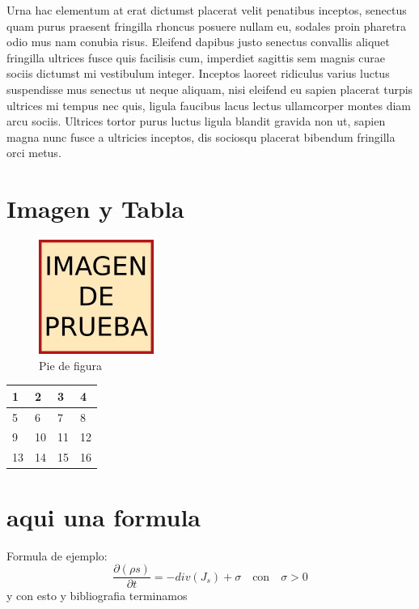 \documentclass[a4paper,12pt]{article}
\begin{document}
Urna hac elementum at erat dictumst placerat velit penatibus inceptos, senectus quam purus praesent fringilla rhoncus posuere nullam eu, sodales proin pharetra odio mus nam conubia risus. Eleifend dapibus justo senectus convallis aliquet fringilla ultrices fusce quis facilisis cum, imperdiet sagittis sem magnis curae sociis dictumst mi vestibulum integer. Inceptos laoreet ridiculus varius luctus suspendisse mus senectus ut neque aliquam, nisi eleifend eu sapien placerat turpis ultrices mi tempus nec quis, ligula faucibus lacus lectus ullamcorper montes diam arcu sociis. Ultrices tortor purus luctus ligula blandit gravida non ut, sapien magna nunc fusce a ultricies inceptos, dis sociosqu placerat bibendum fringilla orci metus.

\section{Imagen y Tabla}
\begin{figure}[H]
\includegraphics{prueba.png}
\caption{Pie de figura}
\end{figure}

\begin{center}
    \begin{tabular}{ | l | l | l | l |}
    \hline
    1 & 2 & 3 & 4 \\ \hline
    5 & 6 & 7 & 8 \\ \hline
    9 & 10 & 11 & 12 \\ \hline
    13 & 14 & 15 & 16 \\\hline
    \end{tabular}
\end{center}

\section{aqui una formula}
Formula de ejemplo:
\begin{equation}
\frac{\partial\left(\rho s\right)}{\partial t}=-div\left(J_{s}\right)+\sigma\,\,\,\,\,\,\text{con}\,\,\,\,\,\,\sigma>0\label{eq:3}
\end{equation}
y con esto y bibliografia terminamos

\pagebreak

\nocite{*}


\end{document}
